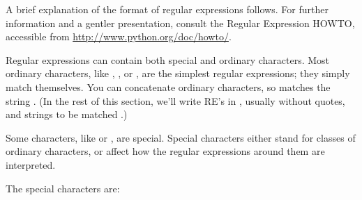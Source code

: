 A brief explanation of the format of regular expressions follows.  For
further information and a gentler presentation, consult the Regular
Expression HOWTO, accessible from \url{http://www.python.org/doc/howto/}.

Regular expressions can contain both special and ordinary characters.
Most ordinary characters, like , , or ,
are the simplest regular expressions; they simply match themselves.  
You can concatenate ordinary characters, so  matches the
string .  (In the rest of this section, we'll write RE's in
, usually without quotes, and strings to be
matched .)

Some characters, like \character{|} or \character{(}, are special.  Special
characters either stand for classes of ordinary characters, or affect
how the regular expressions around them are interpreted.

The special characters are:

